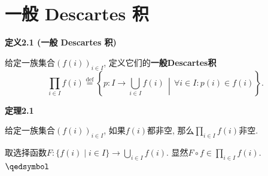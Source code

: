 











\vspace{20pt}

\section{一般 Descartes 积}

\hypertarget{sec:定义2.1}{}
\noindent\textbf{定义2.1 (一般 Descartes 积)}

给定一族集合$(f(i))_{i\in I}$, 定义它们的\textbf{一般Descartes积}
\[
    \prod_{i\in I}f(i)\overset{\mathrm{def}}{=}
    \left\{p:I\to\bigcup_{i\in I}f(i)\,\middle\vert\,
    \forall i\in I:p(i)\in f(i)\right\}.
\]

\vspace{10pt}

\hypertarget{sec:定理2.1}{}
\noindent\textbf{定理2.1}

给定一族集合$(f(i))_{i\in I}$, 如果$f(i)$都非空,
那么$\displaystyle\prod_{i\in I}f(i)$非空.


取选择函数$\displaystyle F:\{f(i)\mid i\in I\}\to\bigcup_{i\in I}f(i)$.
显然$\displaystyle F\circ f\in\prod_{i\in I}f(i)$. \hfill $\qedsymbol$

\vspace{10pt}

